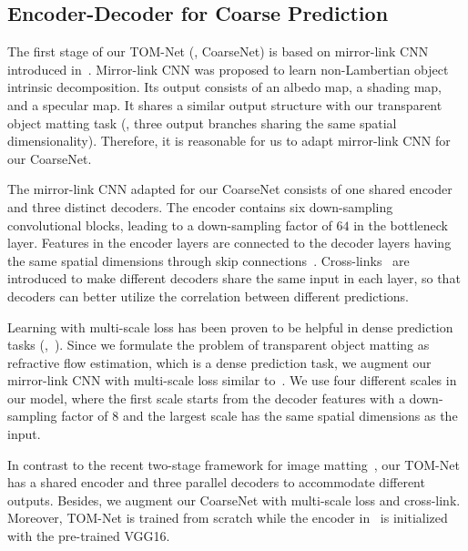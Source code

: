 \subsection{Encoder-Decoder for Coarse Prediction}
\label{sub:Encoder-decoder Net for Coarse Prediction}
The first stage of our TOM-Net (\ie, CoarseNet) is based on mirror-link CNN introduced in~\cite{shi2016learning}. Mirror-link CNN was proposed to learn non-Lambertian object intrinsic decomposition. Its output consists of an albedo map, a shading map, and a specular map. It shares a similar output structure with our transparent object matting task (\ie, three output branches sharing the same spatial dimensionality). Therefore, it is reasonable for us to adapt mirror-link CNN for our CoarseNet. 

The mirror-link CNN adapted for our CoarseNet consists of one shared encoder and three distinct decoders. The encoder contains six down-sampling convolutional blocks, leading to a down-sampling factor of $64$ in the bottleneck layer. Features in the encoder layers are connected to the decoder layers having the same spatial dimensions through skip connections~\cite{ronneberger2015u}. Cross-links~\cite{shi2016learning} are introduced to make different decoders share the same input in each layer, so that decoders can better utilize the correlation between different predictions.

Learning with multi-scale loss has been proven to be helpful in dense prediction tasks (\eg,~\cite{eigen2014depth,fischer2015flownet}). Since we formulate the problem of transparent object matting as refractive flow estimation, which is a dense prediction task, we augment our mirror-link CNN with multi-scale loss similar to~\cite{fischer2015flownet}. 
We use four different scales in our model, where the first scale starts from the decoder features with a down-sampling factor of $8$ and the largest scale has the same spatial dimensions as the input.

In contrast to the recent two-stage framework for image matting~\cite{xu2017deep}, our TOM-Net has a shared encoder and three parallel decoders to accommodate different outputs. Besides, we augment our CoarseNet with multi-scale loss and cross-link. Moreover, TOM-Net is trained from scratch while the encoder in~\cite{xu2017deep} is initialized with the pre-trained VGG16.

\newcommand{\mathL}{\mathcal{L}}
